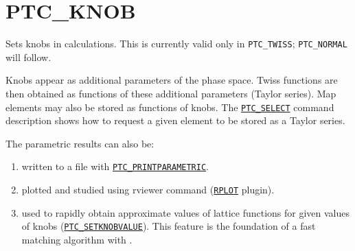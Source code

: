 


\section{PTC\_KNOB}
\label{sec:ptc-knob}


Sets knobs in \ptc calculations. This is currently valid only in
\texttt{PTC\_TWISS}; \texttt{PTC\_NORMAL} will follow. 

Knobs appear as additional parameters of the phase space. Twiss
functions are then obtained as functions of these additional parameters
(Taylor series).  
Map elements may also be stored as functions of knobs. 
The \hyperref[sec:ptc-select]{\texttt{PTC\_SELECT}} command 
description shows how to request a given element to be stored as a 
Taylor series.  

The parametric results can also be: 
\begin{enumerate}
   \item  written to a file with
     \hyperref[sec:ptc-printparametric]{\texttt{PTC\_PRINTPARAMETRIC}}. 
   \item  plotted and studied using rviewer command
     (\hyperref[sec:rplot]{\texttt{RPLOT}} plugin). 
   \item  used to rapidly obtain approximate values of lattice
     functions for given values of knobs
     (\hyperref[sec:ptc-setknobvalue]{\texttt{PTC\_SETKNOBVALUE}}). This
     feature is the foundation of a fast matching algorithm with \ptc.      
\end{enumerate}


